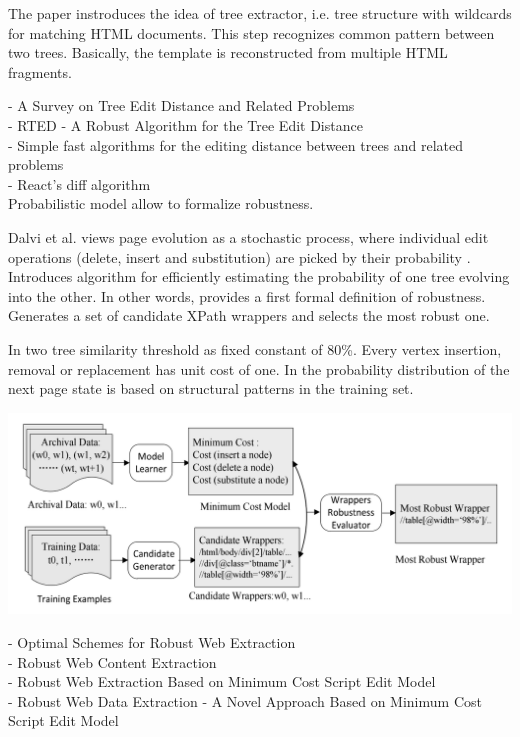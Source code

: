 The paper \cite{de2004a} instroduces the idea of tree extractor, i.e. tree structure with wildcards for matching HTML documents. This step recognizes common pattern between two trees. Basically, the template is reconstructed from multiple HTML fragments.

- A Survey on Tree Edit Distance and Related Problems\\

- RTED - A Robust Algorithm for the Tree Edit Distance\\

- Simple fast algorithms for the editing distance between trees and related problems\\

- React’s diff algorithm\\

Probabilistic model allow to formalize robustness.

Dalvi et al. views page evolution as a stochastic process, where individual edit operations (delete, insert and substitution) are picked by their probability \cite{dalvi2009a}. Introduces algorithm for efficiently estimating the probability of one tree evolving into the other. In other words, provides a first formal definition of robustness. Generates a set of candidate XPath wrappers and selects the most robust one.

In \cite{de2004a} two tree similarity threshold as fixed constant of 80\%. Every vertex insertion, removal or replacement has unit cost of one. In \cite{dalvi2009a} the probability distribution of the next page state is based on structural patterns in the training set.

\includegraphics[width=\linewidth]{figures/robust-web-extraction-framework}


- Optimal Schemes for Robust Web Extraction\\
- Robust Web Content Extraction\\
- Robust Web Extraction Based on Minimum Cost Script Edit Model\\
- Robust Web Data Extraction - A Novel Approach Based on Minimum Cost Script Edit Model\\



